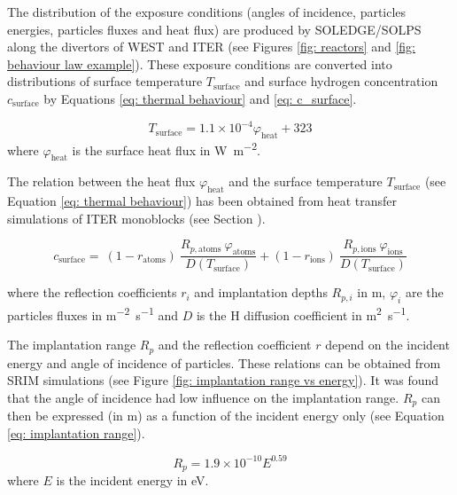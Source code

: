 The distribution of the exposure conditions (angles of incidence, particles energies, particles fluxes and heat flux) are produced by SOLEDGE/SOLPS along the divertors of WEST and ITER (see Figures \ref{fig: reactors} and \ref{fig: behaviour law example}).
These exposure conditions are converted into distributions of surface temperature $T_\mathrm{surface}$ and surface hydrogen concentration $c_\mathrm{surface}$ by Equations \eqref{eq: thermal behaviour} and \eqref{eq: c_surface}.

\begin{equation}
    T_\mathrm{surface} = 1.1\times 10^{-4} \varphi_\mathrm{heat} + 323
    \label{eq: thermal behaviour}
\end{equation}
where $\varphi_\mathrm{heat}$ is the surface heat flux in \si{W.m^{-2}}.

The relation between the heat flux $\varphi_\mathrm{heat}$ and the surface temperature $T_\mathrm{surface}$ (see Equation \eqref{eq: thermal behaviour}) has been obtained from heat transfer simulations of ITER monoblocks (see Section ).

\begin{equation}
    \label{eq: c_surface}
    c_\mathrm{surface} = \ (1 - r_\mathrm{atoms}) \ \frac{R_{p, \mathrm{atoms}} \ \varphi_\mathrm{atoms}}{D(T_\mathrm{surface})} + (1 - r_\mathrm{ions}) \nonumber \ \frac{R_{p, \mathrm{ions}} \ \varphi_\mathrm{ions}}{D(T_\mathrm{surface})}
\end{equation}

where the reflection coefficients $r_i$ and implantation depths $R_{p, i}$ in \si{m}, $\varphi_{i}$ are the particles fluxes in \si{m^{-2}.s^{-1}} and $D$ is the H diffusion coefficient in \si{m^{2}.s^{-1}}.

The implantation range $R_p$ and the reflection coefficient $r$ depend on the incident energy and angle of incidence of particles.
These relations can be obtained from SRIM  simulations (see Figure \ref{fig: implantation range vs energy}).
It was found that the angle of incidence had low influence on the implantation range.
$R_p$ can then be expressed (in \si{m}) as a function of the incident energy only (see Equation \eqref{eq: implantation range}).

\begin{equation}
    R_p = 1.9\times 10^{-10} E ^{0.59}
    \label{eq: implantation range}
\end{equation}
where $E$ is the incident energy in \si{eV}.

